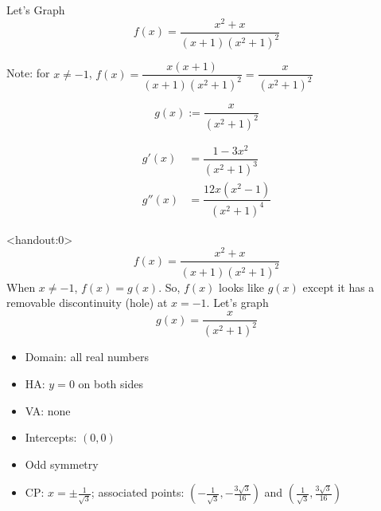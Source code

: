 \begin{frame}[t]{Let's Graph}\AnswerYes\MoreSpace{}
\[f(x)=\frac{x^2+x}{(x+1)(x^2+1)^2}\]\pause

Note: for $x \neq -1$, $f(x) = \dfrac{x(x+1)}{(x+1)(x^2+1)^2} = \dfrac{x}{(x^2+1)^2}$\pause


\[g(x):=\frac{x}{(x^2+1)^2}\]\pause

\begin{align*}
g'(x)&=\dfrac{1-3x^2}{(x^2+1)^3} \\
g''(x)&=\dfrac{12x(x^2-1)}{(x^2+1)^4}
\end{align*}
\end{frame}
\begin{frame}<handout:0>
\color{answercolor}
\[f(x)=\frac{x^2+x}{(x+1)(x^2+1)^2}\]\pause
When $x \neq -1$, $f(x)=g(x)$. So, $f(x)$ looks like $g(x)$ except it has a removable discontinuity (hole) at $x=-1$. Let's graph
\[g(x)=\frac{x}{(x^2+1)^2}\]
\begin{itemize}\color{answercolor}
\item Domain: all real numbers
\item HA: $y=0$ on both sides
\item VA: none
\item Intercepts: $(0,0)$
\item Odd symmetry
\item CP: $x=\pm\frac1{\sqrt 3}$; associated points: $\left(-\frac1{\sqrt 3} ,- \frac{3\sqrt3}{16} \right)$ and 
$\left(\frac1{\sqrt 3} , \frac{3\sqrt3}{16} \right)$
\end{itemize}
\end{frame}

